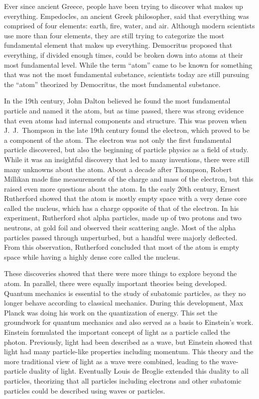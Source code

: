 Ever since ancient Greece, people have been trying to discover what makes up everything. Empedocles, an ancient Greek philosopher, said that everything was comprised of four elements: earth, fire, water, and air. Although modern scientists use more than four elements, they are still trying to categorize the most fundamental element that makes up everything. Democritus proposed that everything, if divided enough times, could be broken down into atoms at their most fundamental level. While the term ``atom'' came to be known for something that was not the most fundamental substance, scientists today are still pursuing the ``atom'' theorized by Democritus, the most fundamental substance. 

In the 19th century, John Dalton believed he found the most fundamental particle and named it the atom, but as time passed, there was strong evidence that even atoms had internal components and structure. This was proven when J.~J.~Thompson in the late 19th century found the electron, which proved to be a component of the atom. The electron was not only the first fundamental particle discovered, but also the beginning of particle physics as a field of study. While it was an insightful discovery that led to many inventions, there were still many unknowns about the atom. About a decade after Thompson, Robert Millikan made fine measurements of the charge and mass of the electron, but this raised even more questions about the atom. In the early 20th century, Ernest Rutherford showed that the atom is mostly empty space with a very dense core called the nucleus, which has a charge opposite of that of the electron. In his experiment, Rutherford shot alpha particles, made up of two protons and two neutrons, at gold foil and observed their scattering angle. Most of the alpha particles passed through unperturbed, but a handful were majorly deflected. From this observation, Rutherford concluded that most of the atom is empty space while having a highly dense core called the nucleus. 

These discoveries showed that there were more things to explore beyond the atom.  In parallel, there were equally important theories being developed. Quantum mechanics is essential to the study of subatomic particles, as they no longer behave according to classical mechanics. During this development, Max Planck was doing his work on the quantization of energy. This set the groundwork for quantum mechanics and also served as a basis to Einstein's work. Einstein formulated the important concept of light as a particle called the photon. Previously, light had been described as a wave, but Einstein showed that light had many particle-like properties including momentum. This theory and the more traditional view of light as a wave were combined, leading to the wave-particle duality of light. Eventually Louis de Broglie extended this duality to all particles, theorizing that all particles including electrons and other subatomic particles could be described using waves or particles.

